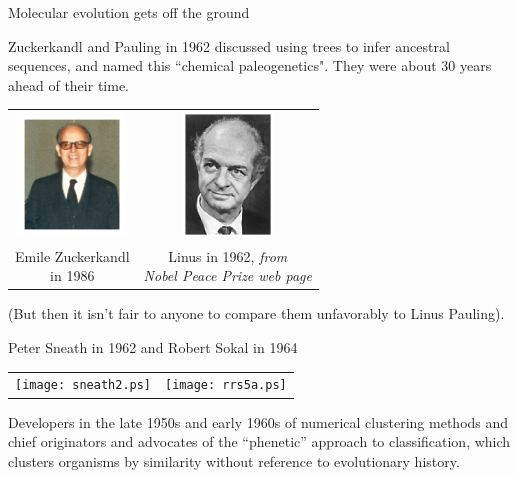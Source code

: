 \documentclass[pdf,bluish,slideColor,colorBG]{prosper}
\begin{document}
\begin{slide}[Replace]{Molecular evolution gets off the ground}

Zuckerkandl and Pauling in 1962 discussed using trees to infer ancestral
sequences, and named this ``chemical paleogenetics".  They were about
30 years ahead of their time.

\begin{center}
\begin{tabular}{c c}
{\includegraphics[height=1.3in]{Zuckerkandl1986.ps}} &
{\includegraphics[height=1.3in]{pauling.ps}} \\
\parbox[t]{1.5in}{Emile Zuckerkandl\\in 1986} &
\parbox[t]{2.0in}{Linus in 1962, {\it from\\ Nobel Peace Prize web page}} \\
\end{tabular}
\end{center}
\medskip

(But then it isn't fair to anyone to compare them unfavorably to Linus Pauling).

\end{slide}


\begin{slide}[Replace]{Peter Sneath in 1962 and Robert Sokal in 1964}

\begin{center}
\begin{tabular}{r l}
\texttt{[image: sneath2.ps]} &
\texttt{[image: rrs5a.ps]}
\end{tabular}
\end{center}
\medskip

Developers in the late 1950s and early 1960s of numerical clustering methods and chief originators and
advocates of the ``phenetic'' approach to classification, which clusters
organisms by similarity without reference to evolutionary history.

\end{slide}
\end{document}

